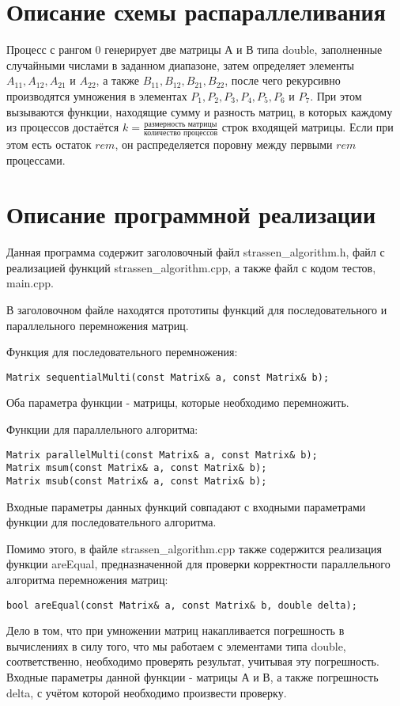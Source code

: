 \documentclass{report}
\begin{document}
\section*{Описание схемы распараллеливания}
\par Процесс с рангом 0 генерирует две матрицы А и В типа double, заполненные случайными числами в заданном диапазоне, затем определяет элементы $A_{11}, A_{12}, A_{21}$ и $A_{22}$, а также $B_{11}, B_{12}, B_{21}, B_{22}$, после чего рекурсивно производятся умножения в элементах $P_1, P_2, P_3, P_4, P_5, P_6$ и $P_7$. При этом вызываются функции, находящие сумму и разность матриц, в которых каждому из процессов достаётся $k = \frac{\text{размерность матрицы}}{\text{количество процессов}}$ строк входящей матрицы. Если при этом есть остаток $rem$, он распределяется поровну между первыми $rem$ процессами.
\newpage

\section*{Описание программной реализации}
Данная программа содержит заголовочный файл strassen\_algorithm.h, файл с реализацией функций strassen\_algorithm.cpp, а также файл с кодом тестов, main.cpp.
\par В заголовочном файле находятся прототипы функций для последовательного и параллельного перемножения матриц.
\par Функция для последовательного перемножения:
\begin{lstlisting}
Matrix sequentialMulti(const Matrix& a, const Matrix& b);
\end{lstlisting}
Оба параметра функции - матрицы, которые необходимо перемножить.
\par Функции для параллельного
алгоритма:
\begin{lstlisting}
Matrix parallelMulti(const Matrix& a, const Matrix& b);
Matrix msum(const Matrix& a, const Matrix& b);
Matrix msub(const Matrix& a, const Matrix& b);
\end{lstlisting}
Входные параметры данных функций совпадают с входными параметрами функции для последовательного алгоритма.
\par Помимо этого, в файле strassen\_algorithm.cpp также содержится реализация функции areEqual, предназначенной для проверки корректности параллельного алгоритма перемножения матриц:
\begin{lstlisting}
bool areEqual(const Matrix& a, const Matrix& b, double delta);
\end{lstlisting}
Дело в том, что при умножении матриц накапливается погрешность в вычислениях в силу того, что мы работаем с элементами типа double, соответственно, необходимо проверять результат, учитывая эту погрешность. Входные параметры данной функции - матрицы А и В, а также погрешность delta, с учётом которой необходимо произвести проверку.
\newpage
\end{document}
